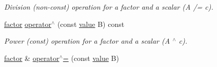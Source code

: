 \begin{DoxyCompactItemize}
\begin{DoxyCompactList}\small\item\em Division (non-\/const) operation for a factor and a scalar (A /= c). \end{DoxyCompactList}\item 
\hypertarget{classmerlin_1_1factor_a715acf9c7d2b2e6dbd4943c83f6b578b}{}\hyperlink{classmerlin_1_1factor}{factor} \hyperlink{classmerlin_1_1factor_a715acf9c7d2b2e6dbd4943c83f6b578b}{operator$^\wedge$} (const \hyperlink{classmerlin_1_1factor_a1b14d19e509403448fbef26b003c9281}{value} B) const \label{classmerlin_1_1factor_a715acf9c7d2b2e6dbd4943c83f6b578b}

\begin{DoxyCompactList}\small\item\em Power (const) operation for a factor and a scalar (A $^\wedge$ c). \end{DoxyCompactList}\item 
\hypertarget{classmerlin_1_1factor_a821c21721c57926e82cb4d39c04865c6}{}\hyperlink{classmerlin_1_1factor}{factor} \& \hyperlink{classmerlin_1_1factor_a821c21721c57926e82cb4d39c04865c6}{operator$^\wedge$=} (const \hyperlink{classmerlin_1_1factor_a1b14d19e509403448fbef26b003c9281}{value} B)\label{classmerlin_1_1factor_a821c21721c57926e82cb4d39c04865c6}


\end{DoxyCompactItemize}
